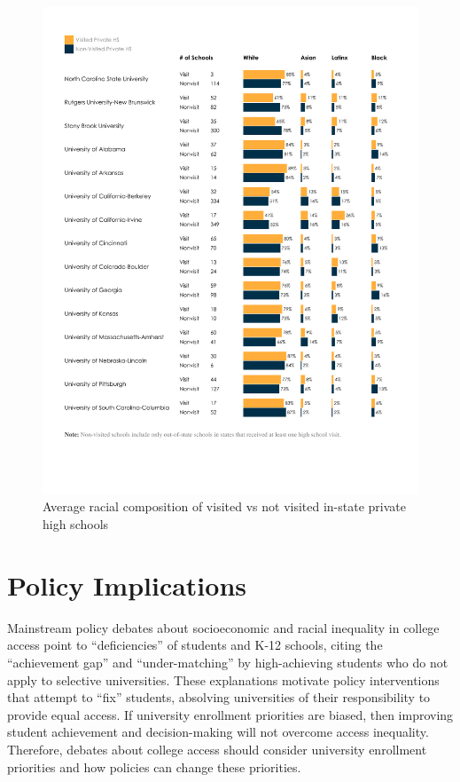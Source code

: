 \documentclass{article}
\begin{document}
\begin{figure}[!ht]
    \centering
    \includegraphics[width=\textwidth, trim={1.25cm, 4cm, 1cm, 1.5cm}, clip]{assets/graphs/race_graph_priv_in.pdf}
    \caption{Average racial composition of visited vs not visited in-state private high schools}
    \label{fig:race_graph_priv_in}
\end{figure}

\section*{Policy Implications}

Mainstream policy debates about socioeconomic and racial inequality in college access point to ``deficiencies'' of students and K-12 schools, citing the ``achievement gap'' and ``under-matching'' by high-achieving students who do not apply to selective universities. These explanations motivate policy interventions that attempt to ``fix'' students, absolving universities of their responsibility to provide equal access. If university enrollment priorities are biased, then improving student achievement and decision-making will not overcome access inequality. Therefore, debates about college access should consider university enrollment priorities and how policies can change these priorities.
\end{document}
